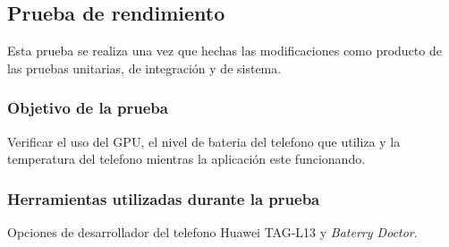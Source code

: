 \subsection{Prueba de rendimiento}
Esta prueba se realiza una vez que hechas las modificaciones como producto de las pruebas unitarias, de integración y de sistema.
\subsubsection{Objetivo de la prueba}
Verificar el uso del GPU, el nivel de bateria del telefono que utiliza y la temperatura del telefono mientras la aplicación este funcionando. 
\subsubsection{Herramientas utilizadas durante la prueba}
Opciones de desarrollador del telefono Huawei TAG-L13 y \textit{Baterry Doctor}.
